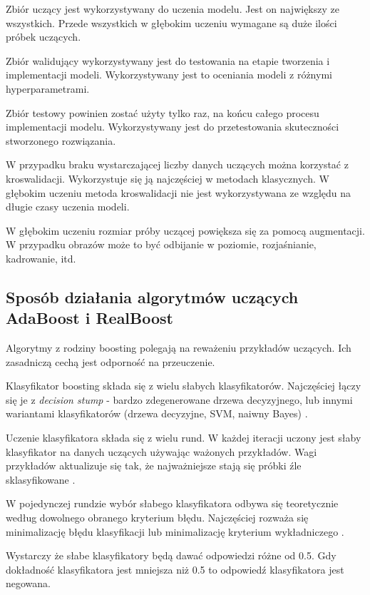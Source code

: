 \documentclass[wi]{zut}
\begin{document}
Zbiór uczący jest wykorzystywany do uczenia modelu. Jest on największy ze wszystkich. Przede wszystkich w głębokim uczeniu wymagane są duże ilości próbek uczących.

Zbiór walidujący wykorzystywany jest do testowania na etapie tworzenia i implementacji modeli. Wykorzystywany jest to oceniania modeli z różnymi hyperparametrami. 

Zbiór testowy powinien zostać użyty tylko raz, na końcu całego procesu implementacji modelu. Wykorzystywany jest do przetestowania skuteczności stworzonego rozwiązania. 

W przypadku braku wystarczającej liczby danych uczących można korzystać z kroswalidacji. Wykorzystuje się ją najczęściej w metodach klasycznych. W głębokim uczeniu metoda kroswalidacji nie jest wykorzystywana ze względu na długie czasy uczenia modeli.

W głębokim uczeniu rozmiar próby uczącej powiększa się za pomocą augmentacji. W przypadku obrazów może to być odbijanie w poziomie, rozjaśnianie, kadrowanie, itd.

\subsection{Sposób działania algorytmów uczących AdaBoost i RealBoost}

Algorytmy z rodziny boosting polegają na reważeniu przykładów uczących. Ich zasadniczą cechą jest odporność na przeuczenie.

Klasyfikator boosting składa się z wielu słabych klasyfikatorów. Najczęściej łączy się je z \emph{decision stump} - bardzo zdegenerowane drzewa decyzyjnego, lub innymi wariantami klasyfikatorów (drzewa decyzyjne, SVM, naiwny Bayes) \cite{Klesk2020}.

Uczenie klasyfikatora składa się z wielu rund. W każdej iteracji uczony jest słaby klasyfikator na danych uczących używając ważonych przykładów. Wagi przykładów aktualizuje się tak, że najważniejsze stają się próbki źle sklasyfikowane \cite{Klesk2020}.

W pojedynczej rundzie wybór słabego klasyfikatora odbywa się teoretycznie według dowolnego obranego kryterium błędu. Najczęściej rozważa się minimalizację błędu klasyfikacji lub minimalizację kryterium wykładniczego \cite{Klesk2020}.

Wystarczy że słabe klasyfikatory będą dawać odpowiedzi różne od 0.5. Gdy dokładność klasyfikatora jest mniejsza niż 0.5 to odpowiedź klasyfikatora jest negowana.
\end{document}
